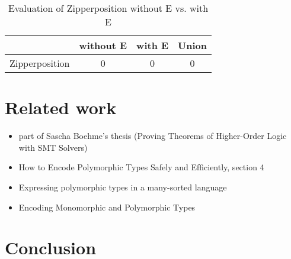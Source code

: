 \documentclass{article}
\begin{document}
\begin{table}[ht]
\caption{Evaluation of Zipperposition without E vs. with E}
\centering\begin{tabular}{@{}lccc@{}}
   \toprule
   & without E & with E & Union \\
   \midrule
   Zipperposition & 0 & 0 & 0 \\
   \bottomrule
\end{tabular}
\end{table}

\break

\section{Related work}

\begin{itemize}
    \item part of Sascha Boehme's thesis (Proving Theorems of Higher-Order Logic with SMT Solvers)
    \item How to Encode Polymorphic Types Safely and Efﬁciently, section 4

    \item Expressing polymorphic types in a many-sorted language
    \item Encoding Monomorphic and Polymorphic Types
\end{itemize}

\section{Conclusion}


\end{document}
